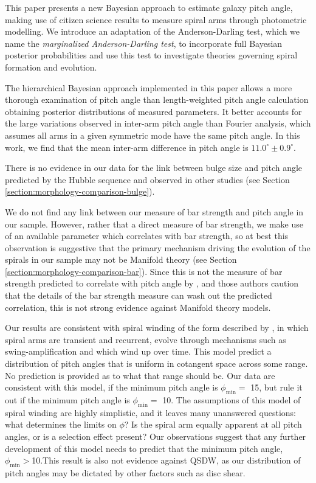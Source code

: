 \label{section:summary}
This paper presents a new Bayesian approach to estimate galaxy pitch angle, making use of citizen science results to measure spiral arms through photometric modelling. We introduce an adaptation of the Anderson-Darling test, which we name the \textit{marginalized Anderson-Darling test}, to incorporate full Bayesian posterior probabilities and use this test to investigate theories governing spiral formation and evolution.

The hierarchical Bayesian approach implemented in this paper allows a more thorough examination of pitch angle than length-weighted pitch angle calculation obtaining posterior distributions of measured parameters. It better accounts for the large variations observed in inter-arm pitch angle than Fourier analysis, which assumes all arms in a given symmetric mode have the same pitch angle. In this work, we find that the mean inter-arm difference in pitch angle is $11.0^\circ\pm 0.9^\circ$.

There is no evidence in our data for the link between bulge size and pitch angle predicted by the Hubble sequence and observed in other studies (see Section \ref{section:morphology-comparison-bulge}).

We do not find any link between our measure of bar strength and pitch angle in our sample. However, rather that a direct measure of bar strength, we make use of an available parameter which correlates with bar strength, so at best this observation is suggestive that the primary mechanism driving the evolution of the spirals in our sample may not be Manifold theory (see Section \ref{section:morphology-comparison-bar}). Since this is not the measure of bar strength predicted to correlate with pitch angle by \citet{2009MNRAS.400.1706A}, and those authors caution that the details of the bar strength measure can wash out the predicted correlation, this is not strong evidence against Manifold theory models.

Our results are consistent with spiral winding of the form described by \citet{2019arXiv190910291P}, in which spiral arms are transient and recurrent, evolve through mechanisms such as swing-amplification \citep{1965MNRAS.130..125G} and which wind up over time. This model predict a distribution of pitch angles that is uniform in cotangent space across some range. No prediction is provided as to what that range should be. Our data are consistent with this model, if the minimum pitch angle is $\phi_\mathrm{min} = $ {15\degree}, but rule it out if the minimum pitch angle is $\phi_\mathrm{min} = $ {10\degree}. The assumptions of this model of spiral winding are highly simplistic, and it leaves many unanswered questions: what determines the limits on $\phi$? Is the spiral arm equally apparent at all pitch angles, or is a selection effect present? Our observations suggest that any further development of this model needs to predict that the minimum pitch angle, $\phi_\mathrm{min}>${10\degree}.This result is also not evidence against QSDW, as our distribution of pitch angles may be dictated by other factors such as disc shear.

